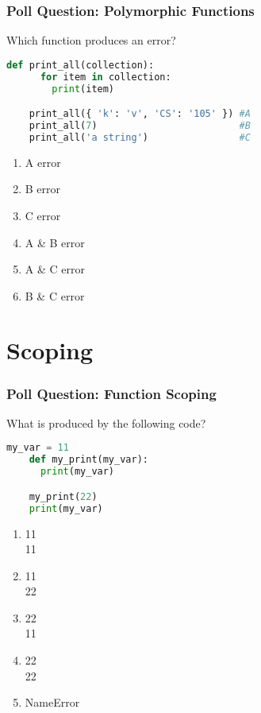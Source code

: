 \documentclass{beamer}
\begin{document}
%
%
\begin{frame}[fragile]
  \frametitle{Poll Question: Polymorphic Functions}
  Which function produces an error?\\
  \vfill
  \begin{minipage}{0.69\textwidth}
    \begin{lstlisting}[language=Python, autogobble]
    def print_all(collection):
      for item in collection:
        print(item)

    print_all({ 'k': 'v', 'CS': '105' }) #A
    print_all(7)                         #B
    print_all('a string')                #C
    \end{lstlisting}
  \end{minipage}
  \hfill
  \begin{minipage}{0.29\textwidth}
    \begin{enumerate}[A]
      \item A error
      \item B error
      \item C error
      \item A \& B error
      \item A \& C error
      \item B \& C error
    \end{enumerate}
  \end{minipage}
\end{frame}


%
%
\section{Scoping}
\begin{frame}[fragile]
  \frametitle{Poll Question: Function Scoping}
  \begin{minipage}{0.69\textwidth}
    What is produced by the following code?
    \begin{lstlisting}[language=Python, autogobble]
    my_var = 11
    def my_print(my_var):
      print(my_var)

    my_print(22)
    print(my_var)
    \end{lstlisting}
  \end{minipage}
  \hfill
  \begin{minipage}{0.29\textwidth}
    \begin{enumerate}[A]
      \item 11\\11
      \item 11\\22
      \item 22\\11
      \item 22\\22
      \item NameError
    \end{enumerate}
  \end{minipage}
\end{frame}
\end{document}
